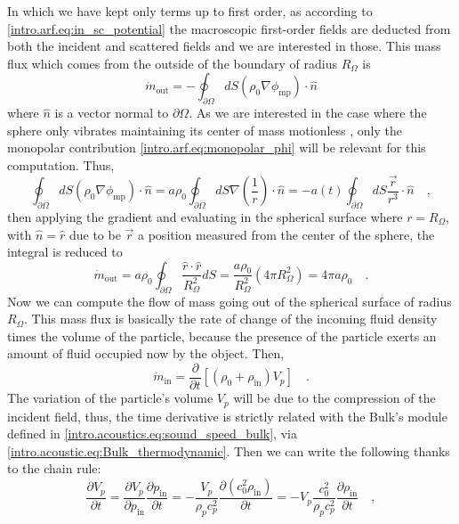 In which we have kept only terms up to first order, as according to \eqref{intro.arf.eq:in_sc_potential} the macroscopic first-order fields are deducted from both the incident and scattered fields and we are interested in those. This mass flux which comes from the outside of the boundary of radius $R_\Omega$ is 
\begin{equation}
    \dot m_{\text{out}} = - \oint_{\partial\Omega} dS(\rho_0\nabla\phi_{\text{mp}})\cdot\hat n
\end{equation}
where $\hat n$ is a vector normal to $\partial\Omega$. As we are interested in the case where the sphere only vibrates maintaining its center of mass motionless \cite[~p.282]{Landau}, \cite[~p.70]{Manneberg2009} only the monopolar contribution \eqref{intro.arf.eq:monopolar_phi} will be relevant for this computation. Thus,
\begin{equation}
    \oint_{\partial\Omega} dS (\rho_0\nabla\phi_{\text{mp}})\cdot\hat n = a\rho_0\oint_{\partial\Omega} dS \nabla\left(\frac{1}{r}\right)\cdot\hat n = -a(t)\oint_{\partial\Omega} dS\frac{\vec r}{r^3}\cdot\hat n\quad,
\end{equation}
then applying the gradient and evaluating in the spherical surface where $r=R_\Omega$, with $\hat n = \hat r$ due to be $\vec r$ a position measured from the center of the sphere, the integral is reduced to
\begin{equation}\label{intro.arf.eq:a_surf_int}
    \dot m_{\text{out}} = a\rho_0\oint_{\partial\Omega}\frac{\hat r\cdot\hat r}{R_\Omega^2} dS = \frac{a\rho_0}{R_\Omega^2} (4\pi R_\Omega^2) = 4\pi a\rho_0\quad.
\end{equation}
Now we can compute the flow of mass going out of the spherical surface of radius $R_\Omega$. This mass flux is basically the rate of change of the incoming fluid density times the volume of the particle, because the presence of the particle exerts an amount of fluid occupied now by the object. Then,
\begin{equation}\label{intro.arf.eq:m_in}
    \dot{m}_{\text{in}} = \frac{\partial}{\partial t}[(\rho_0 + \rho_{\text{in}})V_p]\quad.
\end{equation}
The variation of the particle's volume $V_p$ will be due to the compression of the incident field, thus, the time derivative is strictly related with the Bulk's module defined in \eqref{intro.acoustics.eq:sound_speed_bulk}, via \eqref{intro.acoustic.eq:Bulk_thermodynamic}. Then we can write the following thanks to the chain rule:
\begin{equation}
    \frac{\partial V_p}{\partial t} = \frac{\partial V_p}{\partial p_{\text{in}}}\frac{\partial p_{\text{in}}}{\partial t} = -\frac{V_p}{\rho_p c_p^2}\frac{\partial (c_0^2\rho_{\text{in}})}{\partial t} = -V_p\frac{c_0^2}{\rho_pc_p^2}\frac{\partial\rho_{\text{in}}}{\partial t}\quad,
\end{equation}
